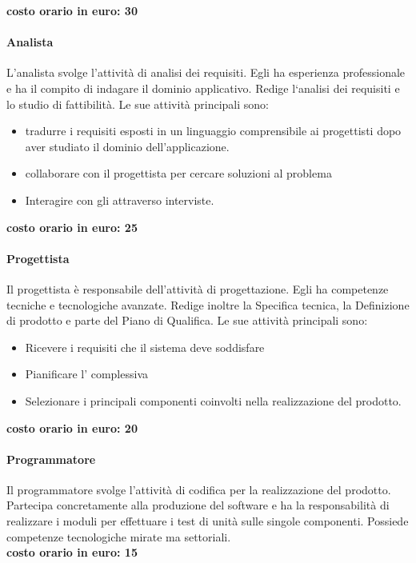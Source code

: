 \documentclass[../norme-di-progetto.tex]{subfiles}
\begin{document}
\textbf{costo orario in euro: 30}

\paragraph{Analista}%
\label{par:analista}
L'analista svolge l'attività di analisi dei requisiti.
Egli ha esperienza professionale e ha il compito di indagare il dominio applicativo.
Redige l`analisi dei requisiti e lo studio di fattibilità. Le sue attività principali sono:

\begin{itemize}
  \item tradurre i requisiti esposti in un linguaggio comprensibile ai progettisti dopo aver studiato il dominio dell'applicazione.
  \item collaborare con il progettista per cercare soluzioni al problema
  \item Interagire con gli  attraverso interviste.
\end{itemize}

\textbf{costo orario in euro: 25}

\paragraph{Progettista}%
\label{par:progettista}
Il progettista è responsabile dell'attività di progettazione.
Egli ha competenze tecniche e tecnologiche avanzate.
Redige inoltre la Specifica tecnica, la Definizione di prodotto e parte del Piano di Qualifica.
Le sue attività principali sono:

\begin{itemize}
  \item Ricevere i requisiti che il sistema deve soddisfare
  \item Pianificare l' complessiva
  \item Selezionare i principali componenti coinvolti nella realizzazione del prodotto.
\end{itemize}

\textbf{costo orario in euro: 20}

\paragraph{Programmatore}%
\label{par:programmatore}
Il programmatore svolge l'attività di codifica per la realizzazione del prodotto.
Partecipa concretamente alla produzione del software e ha la responsabilità di realizzare i moduli per effettuare i test di unità sulle singole componenti.
Possiede competenze tecnologiche mirate ma settoriali.
\\\newline\textbf{costo orario in euro: 15}
\end{document}
